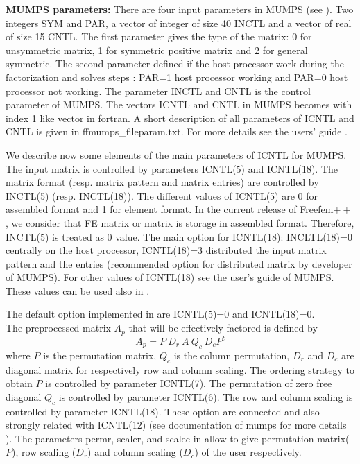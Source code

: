 \documentclass[a4paper,twoside,12pt]{book}
\begin{document}
\begin{paragraph}
{\bf{MUMPS parameters:} } There are four input parameters in MUMPS (see \cite{mumpsuserguide}). Two integers SYM and PAR, a vector of integer of size 40 INCTL and a vector of real of size 15 CNTL.
The first parameter gives the type of the matrix:  0 for unsymmetric matrix, 1 for symmetric positive matrix and 2 for general symmetric. The second parameter defined
if the host processor work during the factorization and solves steps : PAR=1 host processor working and PAR=0 host processor not working.
The parameter INCTL and CNTL  is the control parameter of MUMPS. The vectors ICNTL and CNTL in MUMPS becomes with index 1 like vector in fortran.  A short description of all parameters of ICNTL and CNTL is given in ffmumps\_fileparam.txt. For more details see the users' guide \cite{mumpsuserguide}. 

We describe now some elements of the main parameters of ICNTL for MUMPS. \\

 The input matrix is controlled by parameters ICNTL(5) and ICNTL(18).  The matrix format (resp. matrix pattern and matrix entries)
are controlled by INCTL(5) (resp. INCTL(18)).  The different values of ICNTL(5) are 0 for assembled format and 1 for element format.
In the current release of Freefem$++$, we consider that FE matrix or matrix is storage in assembled format. Therefore, INCTL(5) is treated as 0 value.
The main option for ICNTL(18):  INCLTL(18)=0  centrally on the host processor, ICNTL(18)=3 distributed the input matrix pattern and the entries
(recommended option for distributed matrix by developer of MUMPS). For other values of ICNTL(18) see the user's guide of MUMPS. These values can be used also in \freefempp.

The default option implemented in \freefempp are ICNTL(5)=0 and ICNTL(18)=0.\\

 The preprocessed matrix $A_{p}$ that will be effectively factored is defined by
$$
A_{p} = P \: D_r \: A \: Q_c \ D_c  P^t
$$
where $P$ is the permutation matrix, $Q_c$ is the column permutation, $D_r$ and $D_c$ are diagonal matrix for respectively row and column scaling.
The ordering strategy to obtain $P$ is controlled by parameter ICNTL(7). The permutation of zero free diagonal $Q_c$ is controlled by parameter ICNTL(6).
The row and column scaling is controlled by parameter ICNTL(18). These option are connected and also strongly related with ICNTL(12) (see documentation of mumps
for more details  \cite{mumpsuserguide}).  The parameters permr, scaler, and scalec in \freefempp allow to give permutation matrix($P$), row scaling ($D_r$) and column scaling ($D_c$) of the user respectively.


\end{paragraph}
\end{document}
